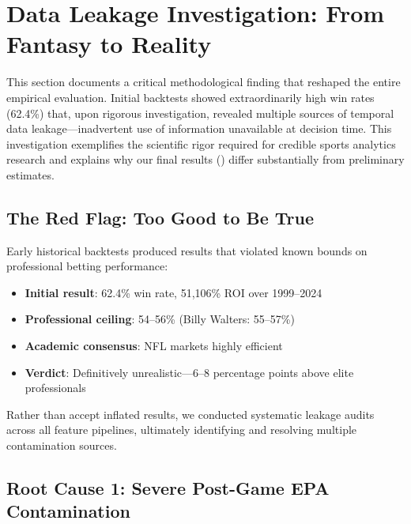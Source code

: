 
\section{Data Leakage Investigation: From Fantasy to Reality}
\label{sec:data-leakage-investigation}

This section documents a critical methodological finding that reshaped the entire empirical evaluation. Initial backtests showed extraordinarily high win rates (62.4\%) that, upon rigorous investigation, revealed multiple sources of temporal data leakage---inadvertent use of information unavailable at decision time. This investigation exemplifies the scientific rigor required for credible sports analytics research and explains why our final results () differ substantially from preliminary estimates.

\subsection{The Red Flag: Too Good to Be True}

Early historical backtests produced results that violated known bounds on professional betting performance:
\begin{itemize}
  \item \textbf{Initial result}: 62.4\% win rate, 51,106\% ROI over 1999--2024
  \item \textbf{Professional ceiling}: 54--56\% (Billy Walters: 55--57\%)
  \item \textbf{Academic consensus}: NFL markets highly efficient \citep{thaler1988anomalies,gray1997regression}
  \item \textbf{Verdict}: Definitively unrealistic---6--8 percentage points above elite professionals
\end{itemize}

Rather than accept inflated results, we conducted systematic leakage audits across all feature pipelines, ultimately identifying and resolving multiple contamination sources.

\subsection{Root Cause 1: Severe Post-Game EPA Contamination}


